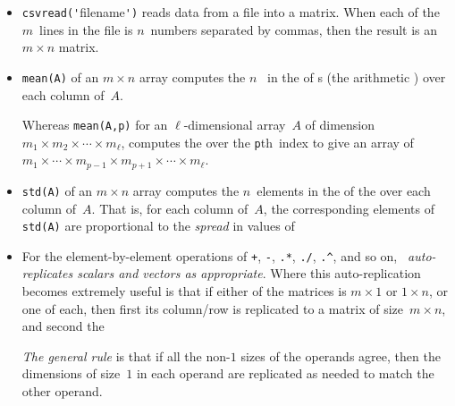 \begin{table}
\begin{minipage}{\linewidth}
\begin{itemize}
\item  {}\verb|csvread('|filename\verb|')| reads data from a file into a matrix.
When each of the \(m\)~lines in the file is \(n\)~numbers separated by commas, then the result is an \(m\times n\) matrix. 

\item {}\verb|mean(A)| of an \(m\times n\) array computes the \(n\)~ in the  of s (the arithmetic ) over each column of~\(A\).

Whereas \verb|mean(A,p)| for an \(\ell\)-dimensional array~\(A\) of dimension \(m_1\times m_2\times\cdots\times m_\ell\),  computes the  over the \verb|p|th~index to give an array of  \(m_1\times\cdots\times m_{p-1}\times m_{p+1}\times\cdots\times m_\ell\).

\item {}\verb|std(A)| of an \(m\times n\) array computes the \(n\)~elements in the  of the  over each column of~\(A\).  
That is, for each column of~\(A\), the corresponding elements of \verb|std(A)| are proportional to the \emph{spread} in values of 

\item For the element-by-element operations of \verb|+|, \verb|-|, \verb|.*|, \verb|./|, \verb|.^|, and so on, \emph{\script\ auto-replicates scalars and vectors as appropriate}. 
Where this auto-replication becomes extremely useful is that if either of the matrices is \(m\times1\) or \(1\times n\), or one of each, then first its column\slash row is replicated to a matrix of size~\(m\times n\), and second the 

\emph{The general rule} is that if all the non-\(1\) sizes of the operands agree, then the dimensions of size~\(1\) in each operand are replicated as needed to match the other operand.



\end{itemize}
\end{minipage}
\end{table}
